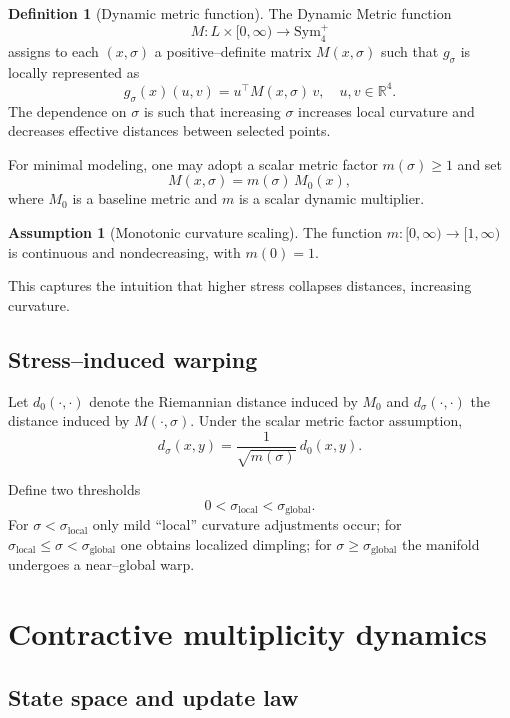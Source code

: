 \documentclass[11pt]{article}
\theoremstyle{plain}
\theoremstyle{definition}
\newtheorem{definition}[theorem]{Definition}
\newtheorem{assumption}[theorem]{Assumption}
\numberwithin{equation}{section}
\begin{document}
\begin{definition}[Dynamic metric function]
The Dynamic Metric function
\[
M : L \times [0,\infty) \to \mathrm{Sym}^+_4
\]
assigns to each $(x,\sigma)$ a positive--definite matrix
$M(x,\sigma)$ such that $g_\sigma$ is locally represented as
\[
g_\sigma(x)(u,v) = u^\top M(x,\sigma)\, v,
\quad u,v \in \mathbb{R}^4.
\]
The dependence on $\sigma$ is such that increasing $\sigma$ increases
local curvature and decreases effective distances between selected
points.
\end{definition}

For minimal modeling, one may adopt a scalar metric factor
$m(\sigma) \ge 1$ and set
\[
M(x,\sigma) = m(\sigma)\, M_0(x),
\]
where $M_0$ is a baseline metric and $m$ is a scalar dynamic
multiplier.

\begin{assumption}[Monotonic curvature scaling]
The function $m : [0,\infty) \to [1,\infty)$ is continuous and
nondecreasing, with $m(0) = 1$.
\end{assumption}

This captures the intuition that higher stress collapses distances,
increasing curvature.

\subsection{Stress--induced warping}

Let $d_0(\cdot,\cdot)$ denote the Riemannian distance induced by $M_0$ and
$d_\sigma(\cdot,\cdot)$ the distance induced by $M(\cdot,\sigma)$.
Under the scalar metric factor assumption,
\begin{equation}
  d_\sigma(x,y) = \frac{1}{\sqrt{m(\sigma)}}\, d_0(x,y).
  \label{eq:distance-warp}
\end{equation}

Define two thresholds
\[
0 < \sigma_{\text{local}} < \sigma_{\text{global}}.
\]
For $\sigma < \sigma_{\text{local}}$ only mild ``local'' curvature
adjustments occur; for $\sigma_{\text{local}} \le \sigma <
\sigma_{\text{global}}$ one obtains localized dimpling; for
$\sigma \ge \sigma_{\text{global}}$ the manifold undergoes a near--global
warp.

\section{Contractive multiplicity dynamics}

\subsection{State space and update law}
\end{document}
